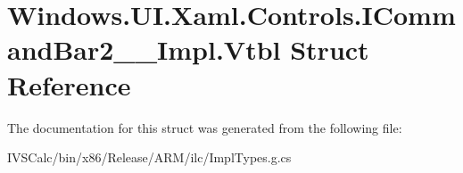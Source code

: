 \hypertarget{struct_windows_1_1_u_i_1_1_xaml_1_1_controls_1_1_i_command_bar2_____impl_1_1_vtbl}{}\section{Windows.\+U\+I.\+Xaml.\+Controls.\+I\+Command\+Bar2\+\_\+\+\_\+\+Impl.\+Vtbl Struct Reference}
\label{struct_windows_1_1_u_i_1_1_xaml_1_1_controls_1_1_i_command_bar2_____impl_1_1_vtbl}


The documentation for this struct was generated from the following file\+:\begin{DoxyCompactItemize}
\item 
I\+V\+S\+Calc/bin/x86/\+Release/\+A\+R\+M/ilc/Impl\+Types.\+g.\+cs\end{DoxyCompactItemize}
